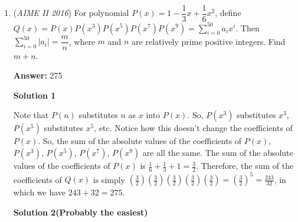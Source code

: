\begin{enumerate}
 Alternate way to find a, b, and c (from VarunGotem) :  $7a=6b+6c$ implies that $6b=7a-6c$. Because $a^2+b^2=c^2$, $36a^2+(6b)^2=36c^2$. Plugging in gives $85a^2-84ac+36c^2=36c^2$. Simplifying gives $85a-84c=0$, and since $a$ and $c$ are relatively prime, $a=84$ and $c=85$. This means $b=13$ and $p=13+84+85=\boxed{182}$.

 



\textbf{Solution 6}

For this problem, first notice that its an infinite geometric series of $6(a+b+c)=\frac{ab}{c-b}$ if $c$ is the hypotenuse. WLOG $a<b$, we can generalize a pythagorean triple of $x^2-y^2, 2xy, x^2+y^2$. Let $b=2xy$, then this generalization gives $6(a+b+c)(c-b)=ab$
 \[(x^2-y^2)2xy=6(2x^2+2xy)(x-y)^2\]
 \[(x+y)xy=6(x^2+xy)(x-y)\]
 \[xy=6x(x-y)\]
 \[7xy=6x^2\]
 \[y=\frac{6}{7}x\]

 Now this is just clear. Let $x=7m$ and $y=6m$ for $m$ to be a positive integer, the pythagorean triple is $13-84-85$ which yields $\boxed{182}$.

 


	\item (\textit{AIME II 2016}) For polynomial $P(x)=1-\dfrac{1}{3}x+\dfrac{1}{6}x^{2}$, define
$Q(x)=P(x)P(x^{3})P(x^{5})P(x^{7})P(x^{9})=\sum_{i=0}^{50} a_ix^{i}$.
Then $\sum_{i=0}^{50} |a_i|=\dfrac{m}{n}$, where $m$ and $n$ are relatively prime positive integers. Find $m+n$.


 
 \textbf{Answer: }275



\textbf{Solution 1}

Note that $P(n)$ substitutes $n$ as $x$ into $P(x)$. So, $P(x^3)$ substitutes $x^3$, $P(x^5)$ substitutes $x^5$, etc. Notice how this doesn't change the coefficients of $P(x)$. So, the sum of the absolute values of the coefficients of $P(x)$, $P(x^3)$, $P(x^5)$, $P(x^7)$, $P(x^9)$ are all the same. The sum of the absolute values of the coefficients of $P(x)$ is $\frac{1}{6} + \frac{1}{3} + 1 = \frac{3}{2}$. Therefore, the sum of the coefficients of $Q(x)$ is simply $\left(\frac{3}{2}\right)\left(\frac{3}{2}\right)\left(\frac{3}{2}\right)\left(\frac{3}{2}\right)\left(\frac{3}{2}\right) = \left(\frac{3}{2}\right)^5 = \frac{243}{32}$, in which we have $243+32 = \boxed{275}$.

 



\textbf{Solution 2(Probably the easiest)}


\end{enumerate}
